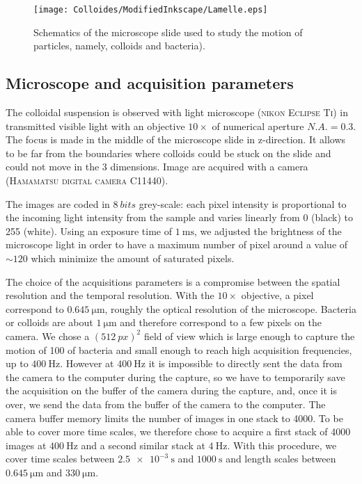 \documentclass[%
 aip,
 jmp,%
 amsmath,amssymb,
reprint,%
]{revtex4-1}
\begin{document}
\begin{figure}
\texttt{[image: Colloides/ModifiedInkscape/Lamelle.eps]}
\caption{Schematics of the microscope slide used to study the motion of particles, namely, colloids and bacteria).}
\label{Slide}
\end{figure}

\subsection{Microscope and acquisition parameters}

The colloidal suspension is observed with light microscope (\textsc{nikon Eclipse Ti}) in transmitted visible light with an objective $10 \times$ of numerical aperture $N.A. = 0.3$. The focus is made in the middle of the microscope slide in z-direction. It allows to be far from the boundaries where colloids could be stuck on the slide and could not move in the 3 dimensions. Image are acquired with a camera (\textsc{Hamamatsu digital camera C11440}).

The images are coded in $\SI{8}{bits}$  grey-scale: each pixel intensity is proportional to the incoming light intensity from the sample and varies linearly from  0 (black) to 255 (white). Using an exposure time of $\SI{1}{\milli\second}$, we adjusted the brightness of the microscope light in order to have a maximum number of pixel around a value of $\sim 120$ which minimize the amount of saturated pixels.

The choice of the acquisitions parameters is a compromise between the spatial resolution and the temporal resolution. With the $10\times$ objective, a pixel correspond to $\SI{0.645}{\micro\meter}$, roughly the optical resolution of the microscope. Bacteria or colloids are about $\SI{1}{\micro\meter}$ and therefore correspond to a few pixels on the camera. We chose a $(\SI{512}{px})^2$ field of view which is large enough to capture the motion of 100 of bacteria and small enough to reach high acquisition frequencies, up to $\SI{400}{\hertz}$. However at $\SI{400}{\hertz}$ it is impossible to directly sent the data from the camera to the computer during the capture, so we have to temporarily save the acquisition on the buffer of the camera during the capture, and, once it is over, we send the data from the buffer of the camera to the computer. The camera buffer memory limits the number of images in one stack to 4000. To be able to cover more time scales, we therefore chose to acquire a first stack of 4000 images at $\SI{400}{\hertz}$ and a second similar stack at $\SI{4}{\hertz}$. With this procedure, we cover time scales between $\SI{2.5e-3}{\second}$ and $\SI{1000}{\second}$ and length scales between $\SI{0.645}{\micro\meter}$ and $\SI{330}{\micro\meter}$.
\end{document}
